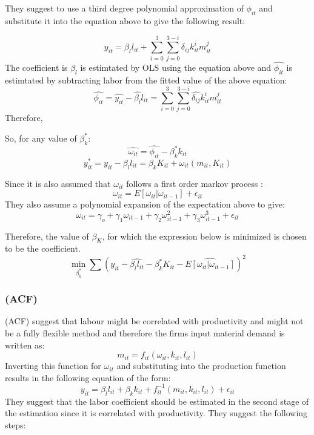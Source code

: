 \documentclass[11pt]{article}
\begin{document}
They suggest to use a third degree polynomial approximation of
$\phi_{it}$ and substitute it into the equation above to give the
following result: 

$$  y_{it} =  \beta_{l}l_{it} + \sum_{i=0}^{3} \sum_{j=0}^{3-i}
\delta_{ij}k_{it}^{i}m_{it}^{j}$$
The coefficient is $\beta_{l}$ is estimtated by OLS using the equation
above and $\hat{\phi_{it}}$ is estimtated by subtracting labor from
the fitted value of the above equation:
$$ \hat{\phi_{it}} = \hat{y_{it}} - \hat{\beta_{l}}l_{it} =
 \sum_{i=0}^{3} \sum_{j=0}^{3-i}
\hat{\delta_{ij}}k_{it}^{i}m_{it}^{j}$$
Therefore, 

So, for any value of $\beta_{k}^{*}$:
$$\hat{\omega_{it}} = \hat{\phi_{it}} - \beta_{k}^{*}k_{it}$$
$$ y_{it}^{*} = y_{it} - \beta_{l}l_{it} = \beta_{k}K_{it}
+ \omega_{it}(m_{it}, K_{it})$$
 
Since it is also assumed that $\omega_{it}$ follows a first order markov
process : 
$$\omega_{it} = E[\omega_{it}|\omega_{it-1}] + \epsilon_{it}$$
They also assume a polynomial expansion of the expectation above to give:
$$ \omega_{it}=  \gamma_{o}+\gamma_{1}\omega_{it-1} +
\gamma_{2}\omega_{it-1}^2 + \gamma_{3}\omega_{it-1}^3 + \epsilon_{it} $$ 

Therefore, the value of $\beta_{K}$, for which the expression below is
minimized is chosen to be the coefficient.  
\begin{equation}
\min_{\beta_{k}^{*}}\sum (y_{it} - \hat{\beta_{l}l_{it}} -
\beta_{k}^{*}K_{it} - \hat{E[\omega_{it}|\omega_{it-1}]})^2 
\end{equation}

\subsubsection{\cite{ackerberg2006structural}(ACF)}
\cite{ackerberg2006structural}(ACF) suggest that labour might be
correlated with productivity and might not be a fully flexible
method and therefore the firms input material demand is written as: 
$$ m_{it} = f_{it}(\omega_{it}, k_{it}, l_{it})$$
Inverting this function for $\omega_{it}$ and substituting into the
production function results in the following 
equation of the form:
\begin{equation}
y_{it} = \beta_{l}l_{it} + \beta_k k_{it} + f_{it}^{-1}(m_{it},
k_{it}, l_{it})+ \epsilon_{it}
\end{equation}
They suggest that the  labor coefficient should be estimated
in the second stage of the estimation since it is correlated with
productivity. 
They suggest the following steps:
\end{document}
